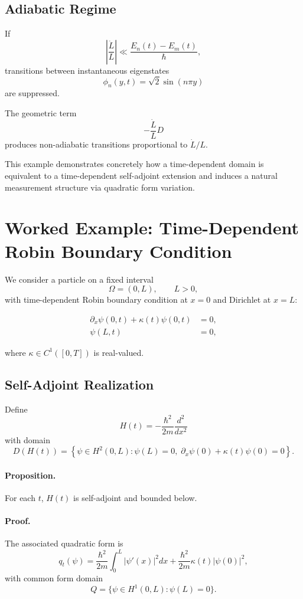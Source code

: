 \documentclass[11pt,a4paper]{article}
\begin{document}
\subsection{Adiabatic Regime}

If
\[
\left|\frac{\dot L}{L}\right|
\ll
\frac{E_n(t)-E_m(t)}{\hbar},
\]
transitions between instantaneous eigenstates
\[
\phi_n(y,t) = \sqrt{2}\sin(n\pi y)
\]
are suppressed.

The geometric term
\[
-\frac{\dot L}{L} D
\]
produces non-adiabatic transitions proportional to $\dot L/L$.

\medskip

This example demonstrates concretely how a time-dependent domain
is equivalent to a time-dependent self-adjoint extension and
induces a natural measurement structure via quadratic form variation.

\section{Worked Example: Time-Dependent Robin Boundary Condition}

We consider a particle on a fixed interval
\[
\Omega = (0,L), \qquad L>0,
\]
with time-dependent Robin boundary condition at $x=0$ and Dirichlet at $x=L$:

\begin{align}
\partial_x \psi(0,t) + \kappa(t)\psi(0,t) &= 0, \\
\psi(L,t) &= 0,
\end{align}

where $\kappa \in C^1([0,T])$ is real-valued.

\subsection{Self-Adjoint Realization}

Define
\[
H(t)
=
-\frac{\hbar^2}{2m}\frac{d^2}{dx^2}
\]
with domain
\[
D(H(t))
=
\left\{
\psi\in H^2(0,L):
\psi(L)=0,
\;
\partial_x\psi(0)+\kappa(t)\psi(0)=0
\right\}.
\]

\paragraph{Proposition.}
For each $t$, $H(t)$ is self-adjoint and bounded below.

\paragraph{Proof.}
The associated quadratic form is
\[
q_t(\psi)
=
\frac{\hbar^2}{2m}
\int_0^L |\psi'(x)|^2 dx
+
\frac{\hbar^2}{2m}
\kappa(t)|\psi(0)|^2,
\]
with common form domain
\[
Q = \{\psi\in H^1(0,L):\psi(L)=0\}.
\]
\end{document}
